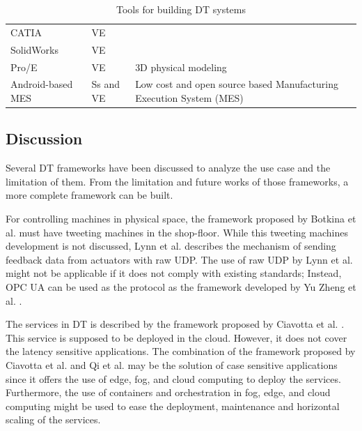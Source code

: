 \documentclass[article,table]{aaltoseries}
\begin{document}
\begin{table}[]
\begin{tabular}{|p{3.8cm}|p{1.5cm}|p{5.8cm}|}
		CATIA                                                        & VE             &                                                                                         \\ \cline{1-2}
		SolidWorks                                                   & VE             &                                                                                         \\ \cline{1-2}
		Pro/E                                                        & VE             & \multirow{-3}{*}{3D physical modeling}                                                  \\ \hline
		Android-based MES \cite{UrbinaCoronado2018} & Ss and VE      & Low cost and open source based Manufacturing Execution System (MES)                     \\ \hline
	\end{tabular}
	\caption{Tools for building DT systems}
	\label{tab:table_tools}
\end{table}

\subsection{Discussion}
Several DT frameworks have been discussed to analyze the use case and the limitation of them. From the limitation and future works of those frameworks, a more complete framework can be built.

For controlling machines in physical space, the framework proposed by Botkina et al. \cite{botkina2018digital} must have tweeting machines in the shop-floor. While this tweeting machines development is not discussed, Lynn et al. \cite{lynn2018realization} describes the mechanism of sending feedback data from actuators with raw UDP. The use of raw UDP by Lynn et al. might not be applicable if it does not comply with existing standards; Instead, OPC UA can be used as the protocol as the framework developed by Yu Zheng et al. \cite{zheng2019application}.

The services in DT is described by the framework proposed by Ciavotta et al. \cite{ciavotta2017microservice}. This service is supposed to be deployed in the cloud. However, it does not cover the latency sensitive applications. The combination of the framework proposed by Ciavotta et al. and Qi et al. \cite{qi2018modeling} may be the solution of case sensitive applications since it offers the use of edge, fog, and cloud computing to deploy the services. Furthermore, the use of containers and orchestration in fog, edge, and cloud computing might be used to ease the deployment, maintenance and horizontal scaling of the services. 
\end{document}
